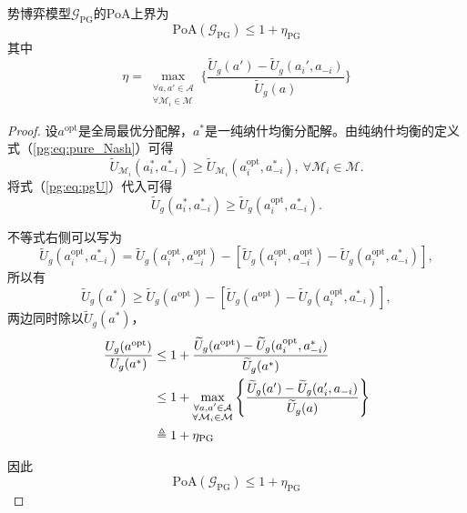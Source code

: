 \begin{proposition}
\label{pg:pro:PoA}
	势博弈模型$\mathcal{G}_{\text{PG}}$的PoA上界为
	\begin{equation}
	\label{pg:pro:eq:High_Bound_PoA}
		\mathrm{PoA}(\mathcal{G}_{\text{PG}}) \leq 1 + \eta_{\text{PG}}
	\end{equation}
	其中
	\begin{equation}
	\label{pg:pro:eq:eta_PoA}
		\eta= \max_{\substack{\forall a,a' \in \mathcal{A}\\ \forall \mathcal{M}_i \in \mathcal{M}}} \Bigg\{ \frac{\widetilde U_g(a') - \widetilde U_g(a_i',a_{-i})}{\widetilde U_g(a)} \Bigg\}
	\end{equation}
	
	\begin{proof}
		设$a^{\text{opt}}$是全局最优分配解，$a^*$是一纯纳什均衡分配解。由纯纳什均衡的定义式（\ref{pg:eq:pure_Nash}）可得
		\begin{equation}
		\label{pg:pro:eq:inequality_Um}
			\widetilde U_{\mathcal{M}_i}(a_i^*,a_{-i}^*) \geq \widetilde U_{\mathcal{M}_i}(a_i^{\text{opt}},a_{-i}^*),\ \forall \mathcal{M}_i \in \mathcal{M}.
		\end{equation}
		将式（\ref{pg:eq:pgU}）代入可得
		\begin{equation}
		\label{pg:pro:eq:inequality_Ug}
			\widetilde U_g(a_i^*,a_{-i}^*) \geq \widetilde U_g(a_i^{\text{opt}},a_{-i}^*).
		\end{equation}
		
		不等式右侧可以写为
		\begin{equation}
		\label{pg:pro:eq:rewrite}
			\widetilde U_g(a_i^{\text{opt}},a_{-i}^*) = \widetilde U_g(a_i^{\text{opt}},a_{-i}^{\text{opt}}) - [\widetilde U_g(a_i^{\text{opt}},a_{-i}^{\text{opt}}) - \widetilde U_g(a_i^{\text{opt}},a_{-i}^*)],
		\end{equation}
		所以有
		\begin{equation}
		\label{pg:pro:eq:relation_opt_nash}
			\widetilde U_g(a^*) \geq \widetilde U_g(a^{\text{opt}}) - [\widetilde U_g(a^{\text{opt}}) - \widetilde U_g(a_i^{\text{opt}},a_{-i}^*)],
		\end{equation}
		两边同时除以$\widetilde U_g(a^*)$，
		\begin{align}
		\label{pg:pro:eq:cal_PoA}
			\frac{U_g(a^{\text{opt}})}{U_g(a^*)} &\leq 1 + \frac{\widetilde U_g(a^{\text{opt}}) - \widetilde U_g(a_i^{\text{opt}},a_{-i}^*)}{\widetilde U_g(a^*)}\notag\\
			&\leq 1 + \max_{\substack{\forall a,a' \in \mathcal{A}\\ \forall \mathcal{M}_i \in \mathcal{M}}} \Bigg\{ \frac{\widetilde U_g(a') - \widetilde U_g(a_i',a_{-i})}{\widetilde U_g(a)} \Bigg\}\notag\\
			&\triangleq 1 +\eta_{\text{PG}}
		\end{align}
		
		因此
		\begin{equation}
		\label{pg:pro:eq:comclusion_PoA}
			\mathrm{PoA}(\mathcal{G}_{\text{PG}}) \leq 1 + \eta_{\text{PG}}
		\end{equation}
	\end{proof}
\end{proposition}

